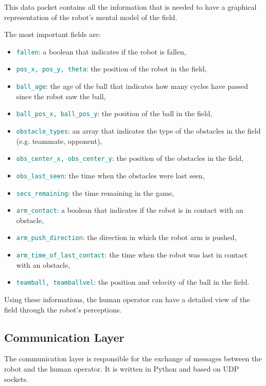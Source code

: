 \documentclass[a4paper, onecolumn, 12pt]{article}
\newcommand\code[1]{\textcolor{teal}{\texttt{#1}}}
\begin{document}
This data packet contains all the information that is needed to have a graphical
representation of the robot's mental model of the field.

The most important fields are:
\begin{itemize}
    \item \code{fallen}: a boolean that indicates if the robot is fallen,
    \item \code{pos\_x, pos\_y, theta}: the position of the robot in the field,
    \item \code{ball\_age}: the age of the ball that indicates how many cycles have passed since the robot saw the ball,
    \item \code{ball\_pos\_x, ball\_pos\_y}: the position of the ball in the field,
    \item \code{obstacle\_types}: an array that indicates the type of the obstacles in the field (e.g. teammate, opponent),
    \item \code{obs\_center\_x, obs\_center\_y}: the position of the obstacles in the field,
    \item \code{obs\_last\_seen}: the time when the obstacles were last seen,
    \item \code{secs\_remaining}: the time remaining in the game,
    \item \code{arm\_contact}: a boolean that indicates if the robot is in contact with an obstacle,
    \item \code{arm\_push\_direction}: the direction in which the robot arm is pushed,
    \item \code{arm\_time\_of\_last\_contact}: the time when the robot was last in contact with an obstacle,
    \item \code{teamball, teamballvel}: the position and velocity of the ball in the field.
\end{itemize}
Using these informations, the human operator can have a detailed view of the field through the robot's perceptions.

\subsection{Communication Layer}

The communication layer is responsible for the exchange of messages between the
robot and the human operator. It is written in Python and based on UDP sockets. 
\end{document}
